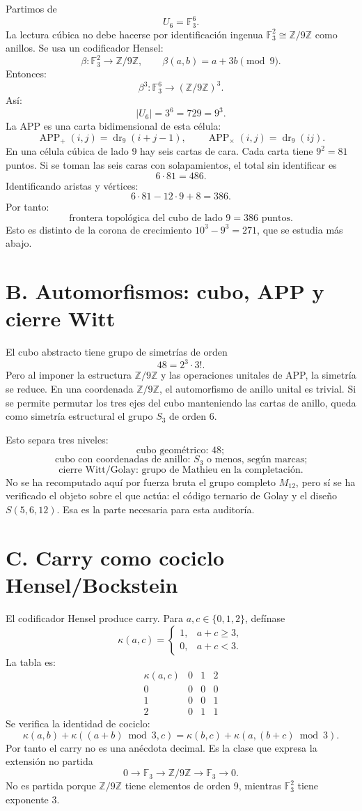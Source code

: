 \documentclass[11pt,a4paper]{article}
\theoremstyle{definition}\newtheorem{definicion}[teorema]{Definici\'on}
\theoremstyle{remark}\newtheorem{observacion}[teorema]{Observaci\'on}
\newcommand{\F}{\mathbb F}
\newcommand{\Z}{\mathbb Z}
\newcommand{\APP}{\operatorname{APP}}
\newcommand{\dr}{\operatorname{dr}_9}
\begin{document}
Partimos de
\[
U_6=\F_3^6.
\]
La lectura c\'ubica no debe hacerse por identificaci\'on ingenua \(\F_3^2\cong\Z/9\Z\) como anillos. Se usa un codificador Hensel:
\[
\beta:\F_3^2\longrightarrow \Z/9\Z,
\qquad
\beta(a,b)=a+3b\pmod9.
\]
Entonces:
\[
\beta^3: \F_3^6\longrightarrow (\Z/9\Z)^3.
\]
As\'i:
\[
|U_6|=3^6=729=9^3.
\]
La APP es una carta bidimensional de esta c\'elula:
\[
\APP_+(i,j)=\dr(i+j-1),
\qquad
\APP_\times(i,j)=\dr(ij).
\]
En una c\'elula c\'ubica de lado 9 hay seis cartas de cara. Cada carta tiene \(9^2=81\) puntos. Si se toman las seis caras con solapamientos, el total sin identificar es
\[
6\cdot81=486.
\]
Identificando aristas y v\'ertices:
\[
6\cdot81-12\cdot9+8=386.
\]
Por tanto:
\[
\boxed{\text{frontera topol\'ogica del cubo de lado }9=386\text{ puntos}.}
\]
Esto es distinto de la corona de crecimiento \(10^3-9^3=271\), que se estudia m\'as abajo.

\section{B. Automorfismos: cubo, APP y cierre Witt}

El cubo abstracto tiene grupo de simetr\'ias de orden
\[
48=2^3\cdot3!.
\]
Pero al imponer la estructura \(\Z/9\Z\) y las operaciones unitales de APP, la simetr\'ia se reduce. En una coordenada \(\Z/9\Z\), el automorfismo de anillo unital es trivial. Si se permite permutar los tres ejes del cubo manteniendo las cartas de anillo, queda como simetr\'ia estructural el grupo \(S_3\) de orden 6.

Esto separa tres niveles:
\[
\boxed{\text{cubo geom\'etrico: }48;}
\]
\[
\boxed{\text{cubo con coordenadas de anillo: }S_3\text{ o menos, seg\'un marcas;}}
\]
\[
\boxed{\text{cierre Witt/Golay: grupo de Mathieu en la completaci\'on}.}
\]
No se ha recomputado aqu\'i por fuerza bruta el grupo completo \(M_{12}\), pero s\'i se ha verificado el objeto sobre el que act\'ua: el c\'odigo ternario de Golay y el dise\~no \(S(5,6,12)\). Esa es la parte necesaria para esta auditor\'ia.

\section{C. Carry como cociclo Hensel/Bockstein}

El codificador Hensel produce carry. Para \(a,c\in\{0,1,2\}\), def\'inase
\[
\kappa(a,c)=
\begin{cases}
1,&a+c\ge3,\\
0,&a+c<3.
\end{cases}
\]
La tabla es:
\[
\begin{array}{c|ccc}
\kappa(a,c)&0&1&2\\
\hline
0&0&0&0\\
1&0&0&1\\
2&0&1&1
\end{array}
\]
Se verifica la identidad de cociclo:
\[
\kappa(a,b)+\kappa((a+b)\bmod3,c)
=
\kappa(b,c)+\kappa(a,(b+c)\bmod3).
\]
Por tanto el carry no es una an\'ecdota decimal. Es la clase que expresa la extensi\'on no partida
\[
0\longrightarrow\F_3\longrightarrow\Z/9\Z\longrightarrow\F_3\longrightarrow0.
\]
No es partida porque \(\Z/9\Z\) tiene elementos de orden 9, mientras \(\F_3^2\) tiene exponente 3.
\end{document}
